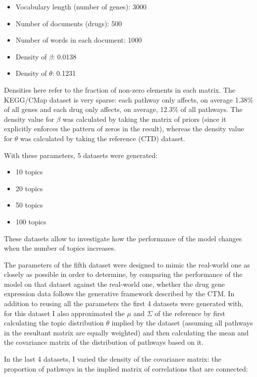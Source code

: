 \documentclass[12pt,a4paper,twoside,openright]{report}
\begin{document}
\begin{itemize}[noitemsep]
\item Vocabulary length (number of genes): 3000
\item Number of documents (drugs): 500
\item Number of words in each document: 1000
\item Density of $\beta$: 0.0138
\item Density of $\theta$: 0.1231
\end{itemize}

Densities here refer to the fraction of non-zero elements in each matrix. The KEGG/CMap dataset is very sparse: each pathway only affects, on average 1.38\% of all genes and each drug only affects, on average, 12.3\% of all pathways. The density value for $\beta$ was calculated by taking the matrix of priors (since it explicitly enforces the pattern of zeros in the result), whereas the density value for $\theta$ was calculated by taking the reference (CTD) dataset.

With these parameters, 5 datasets were generated:

\begin{itemize}[noitemsep]
\item 10 topics
\item 20 topics
\item 50 topics
\item 100 topics
\end{itemize}

These datasets allow to investigate how the performance of the model changes when the number of topics increases.

The parameters of the fifth dataset were designed to mimic the real-world one as closely as possible in order to determine, by comparing the performance of the model on that dataset against the real-world one, whether the drug gene expression data follows the generative framework described by the CTM. In addition to reusing all the parameters the first 4 datasets were generated with, for this dataset I also approximated the $\mu$ and $\Sigma$ of the reference by first calculating the topic distribution $\theta$ implied by the dataset (assuming all pathways in the resultant matrix are equally weighted) and then calculating the mean and the covariance matrix of the distribution of pathways based on it.

In the last 4 datasets, I varied the density of the covariance matrix: the proportion of pathways in the implied matrix of correlations that are connected:
\end{document}
